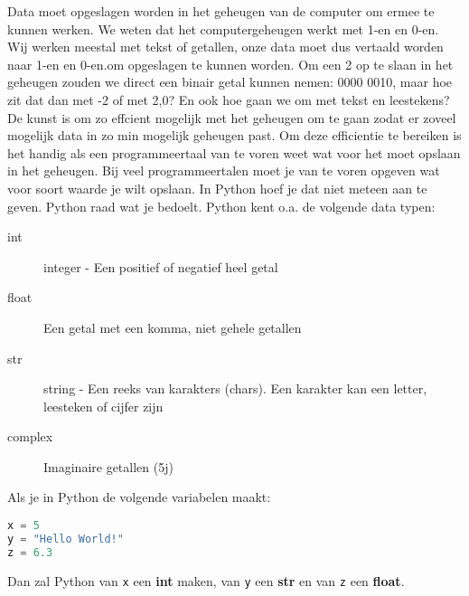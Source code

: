 Data moet opgeslagen worden in het geheugen van de computer om ermee te kunnen werken. We weten dat het computergeheugen werkt met 1-en en 0-en. Wij werken meestal met tekst of getallen, onze data moet dus vertaald worden naar 1-en en 0-en.om opgeslagen te kunnen worden. Om een 2 op te slaan in het geheugen zouden we direct een binair getal kunnen nemen: 0000 0010, maar hoe zit dat dan met -2 of met 2,0? En ook hoe gaan we om met tekst en leestekens? De kunst is om zo effcient mogelijk met het geheugen om te gaan zodat er zoveel mogelijk data in zo min mogelijk geheugen past.
Om deze efficientie te bereiken is het handig als een programmeertaal van te voren weet wat voor  het moet opslaan in het geheugen. Bij veel programmeertalen moet je van te voren opgeven wat voor soort waarde je wilt opslaan. In Python hoef je dat niet meteen aan te geven. Python raad wat je bedoelt.
Python kent o.a. de volgende data typen:
\begin{description}
\item[int] integer - Een positief of negatief heel getal
\item[float] Een getal met een komma, niet gehele getallen
\item[str] string - Een reeks van karakters (chars). Een karakter kan een letter, leesteken of cijfer zijn
\item[complex] Imaginaire getallen (5j)
\end{description}
Als je in Python de volgende variabelen maakt:
\begin{lstlisting}[language=python]
x = 5
y = "Hello World!"
z = 6.3
\end{lstlisting}
Dan zal Python van \texttt{x} een \textbf{int} maken, van \texttt{y} een \textbf{str} en van \texttt{z} een \textbf{float}.

